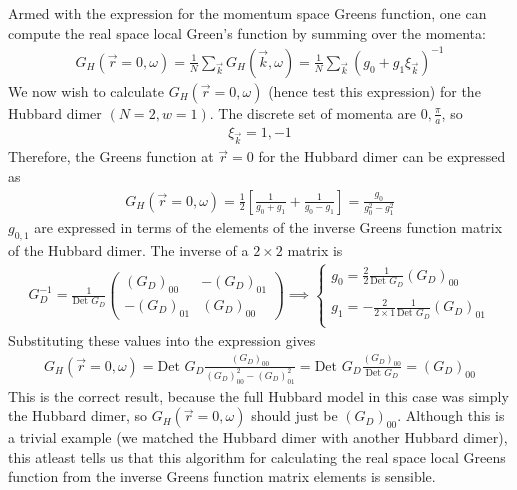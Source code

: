 \documentclass[12pt]{article}
\numberwithin{equation}{section}
\begin{document}
Armed with the expression for the momentum space Greens function, one can compute the real space local Green's function by summing over the momenta:
\begin{equation}\begin{aligned}
	G_H(\vec r = 0, \omega) = \frac{1}{N}\sum_{\vec k} G_H(\vec k, \omega) = \frac{1}{N}\sum_{\vec k}\left(g_0 + g_1 \xi_{\vec k}\right)^{-1}
\end{aligned}\end{equation}
We now wish to calculate \(G_H(\vec r = 0, \omega)\) (hence test this expression) for the Hubbard dimer \(\left(N = 2, w = 1 \right)\). The discrete set of momenta are $0, \frac{\pi}{a}$, so
\begin{equation}\begin{aligned}
	\xi_{\vec k} = 1, -1
\end{aligned}\end{equation}
Therefore, the Greens function at $\vec r=0$ for the Hubbard dimer can be expressed as
\begin{equation}\begin{aligned}
	G_H(\vec r = 0, \omega) = \frac{1}{2}\left[\frac{1}{g_0 + g_1} + \frac{1}{g_0 - g_1}\right]  = \frac{g_0}{g_0^2 - g_1^2}
\end{aligned}\end{equation}
$g_{0,1}$ are expressed in terms of the elements of the inverse Greens function matrix of the Hubbard dimer. The inverse of a $2\times 2$ matrix is
\begin{equation}\begin{aligned}
	G_D^{-1} = \frac{1}{\text{Det }G_D}\begin{pmatrix} \left(G_D\right)_{00} &  -\left(G_D\right)_{01} \\ -\left(G_D\right)_{01} & \left(G_D\right)_{00}\end{pmatrix} \implies \begin{cases}
		g_0 = \frac{2}{2} \frac{1}{\text{Det }G_D}\left(G_D\right)_{00} \\
		\\
		g_1 = -\frac{2}{2\times 1}\frac{1}{\text{Det }G_D}\left(G_D\right)_{01} \\
	\end{cases}
\end{aligned}\end{equation}
Substituting these values into the expression gives
\begin{equation}\begin{aligned}
	G_H(\vec r = 0, \omega) = \text{Det }G_D\frac{\left(G_D\right)_{00}}{\left(G_D\right)_{00}^2 - \left(G_D\right)_{01}^2} = \text{Det }G_D\frac{\left(G_D\right)_{00}}{\text{Det }G_D} = \left(G_D\right)_{00}
\end{aligned}\end{equation}
This is the correct result, because the full Hubbard model in this case was simply the Hubbard dimer, so \(G_H(\vec r = 0, \omega)\) should just be \(\left(G_D\right)_{00}\). Although this is a trivial example (we matched the Hubbard dimer with another Hubbard dimer), this atleast tells us that this algorithm for calculating the real space local Greens function from the inverse Greens function matrix elements is sensible.
\end{document}
